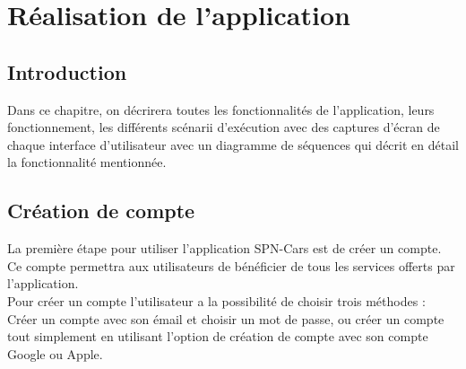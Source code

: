\chapter{Réalisation de l'application}
\minitoc
\cleardoublepage
\section*{Introduction}
Dans ce chapitre, on décrirera toutes les fonctionnalités de l'application, leurs fonctionnement, les différents scénarii d'exécution avec des captures d'écran de chaque interface d'utilisateur avec un diagramme de séquences qui décrit en détail la fonctionnalité mentionnée.
\justifying
\section{Création de compte}
La première étape pour utiliser l'application SPN-Cars est de créer un compte. Ce compte permettra aux utilisateurs de bénéficier de tous les services offerts par l'application.\\
\noindent Pour créer un compte l'utilisateur a la possibilité de choisir trois méthodes : Créer un compte avec son émail et choisir un mot de passe, ou créer un compte tout simplement en utilisant l'option de création de compte avec son compte Google ou Apple.
